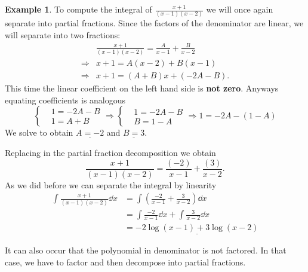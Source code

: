 \documentclass[12pt]{article}
\theoremstyle{plain}
\theoremstyle{definition}
\newtheorem{Ex}[Th]{Example}           %
\theoremstyle{remark}
\renewcommand{\:}{\colon}           %
\newcommand{\un}[1]{\underline{#1}}
\renewcommand{\.}{\Cdot}                %
\newcommand{\To}{\Rightarrow}
\begin{document}
\begin{multicols}{2}
\begin{Ex}
To compute the integral of $\frac{x+1}{(x-1)(x-2)}$ we will once again separate into partial fractions. Since the factors of the denominator are linear, we will separate into two fractions:
\begin{align*}
  &\frac{x+1}{(x-1)(x-2)}=\frac{A}{x-1}+\frac{B}{x-2}\\
  \To&x+1=A(x-2)+B(x-1)\\
  \To&x+1=(A+B)x+(-2A-B).
\end{align*}
This time the linear coefficient on the left hand side is \textbf{not zero}. Anyways equating coefficients is analogous
$$
\left\lbrace
\begin{aligned}
  &1=-2A-B\\
  &1=A+B
\end{aligned}
\right.\To
\left\lbrace
\begin{aligned}
  &1=-2A-B\\
  &B=1-A
\end{aligned}
\right.\To
1=-2A-(1-A)
$$
We solve to obtain $\un{A=-2}$ and $\un{B=3}$.\par 
Replacing in the partial fraction decomposition we obtain 
$$\frac{x+1}{(x-1)(x-2)}=\frac{(-2)}{x-1}+\frac{(3)}{x-2}.$$
As we did before we can separate the integral by linearity
\begin{align*}
  \int\frac{x+1}{(x-1)(x-2)}\dd x&=\int\left(\frac{-2}{x-1}+\frac{3}{x-2}\right)\dd x\\
  &=\int\frac{-2}{x-1}\dd x+\int\frac{3}{x-2}\dd x\\
  &=\un{-2\log(x-1)+3\log(x-2)}
\end{align*}
\end{Ex}

It can also occur that the polynomial in denominator is not factored. In that case, we have to factor and then decompose into partial fractions.


\end{multicols}
\end{document}
